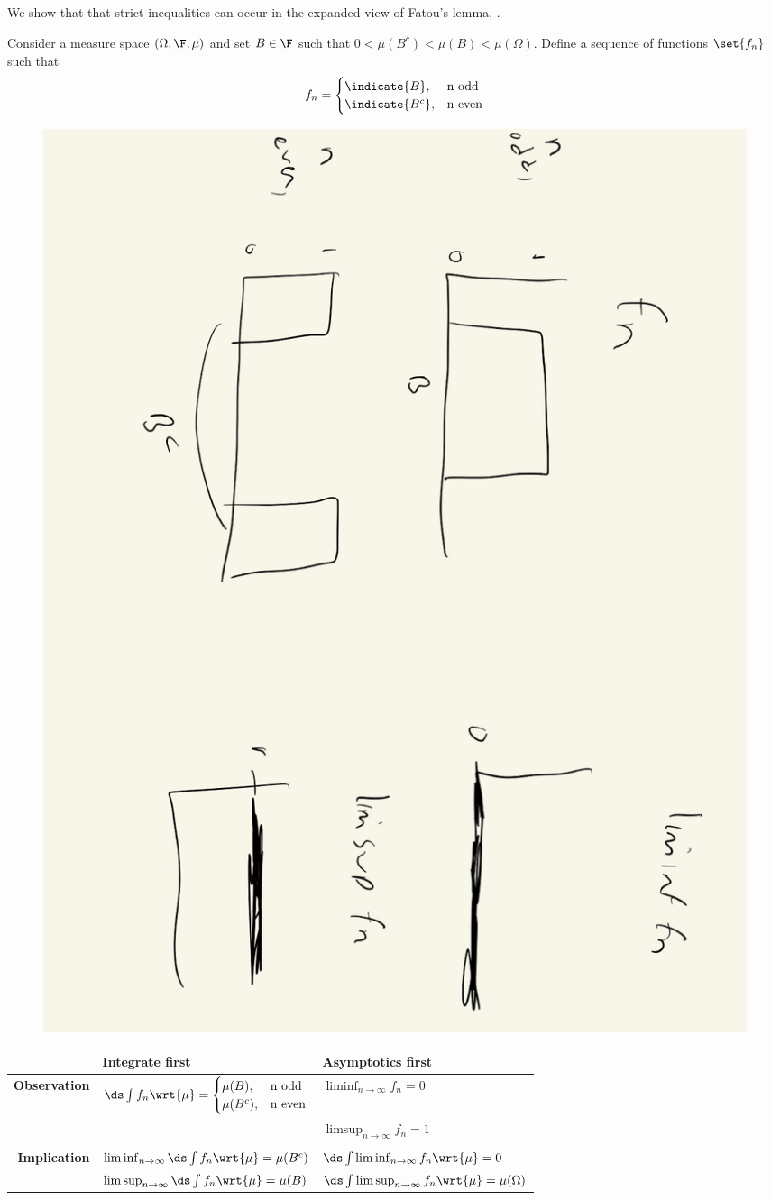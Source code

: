 \documentclass{article} %
\newcommand{\dint}{\ds\int}
\newcommand{\dmu}{\wrt{\mu}}
\begin{document}
\begin{example}{}
We show that that strict inequalities can occur in the expanded view of Fatou's lemma, .  

Consider a measure space $(\Omega, \F, \mu)$ and set $B \in \F$ such that $0 < \mu(B^c) < \mu(B) < \mu(\Omega)$. 
Define a sequence of functions $\set{f_n}$ such that
\[ f_n = 
\begin{cases}
\indicate{B}, & \text{n odd} \\ 
\indicate{B^c}, & \text{n even} \\ 	
 \end{cases}
 \]	
 
 \begin{figure}[H]
 \centering 
 \includegraphics[width=.4\textwidth, angle=90]{images/fatous_lemma_example}	
 \end{figure}

 \begin{table}[htp!]
 \begin{tabular}{rl|l}
 & \textbf{Integrate first} & \textbf{Asymptotics first} \\
 \hline 
\textbf{Observation} & $\dint f_n  \dmu = 
\begin{cases}
\mu(B), & \text{n odd} \\ 
\mu(B^c), & \text{n even} \\ 	
 \end{cases}$	 &  $\liminf_{n \to \infty} f_n =0$ \\
 & & $\limsup_{n \to \infty} f_n =1$\\
 & & \\
\textbf{Implication} & $\liminf_{n \to \infty} \dint f_n \dmu = \mu(B^c)$ & $\dint \liminf_{n \to \infty} f_n \dmu = 0$ \\
& $\limsup_{n \to \infty} \dint f_n \dmu = \mu(B)$ & $\dint \limsup_{n \to \infty} f_n \dmu = \mu(\Omega)$ \\
 \end{tabular}
 \end{table}


\end{example}
\end{document}
